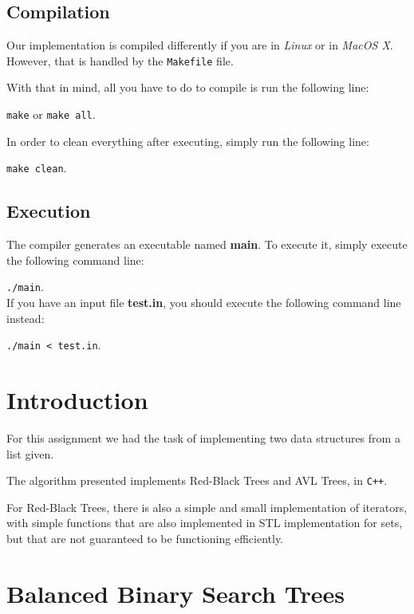 \documentclass[12pt,a4paper,oneside]{article}
\theoremstyle{definition}
\begin{document}
\subsection{Compilation}\label{subsec:compile}

Our implementation is compiled differently if you are in \textit{Linux} or in \textit{MacOS X}. However, that is handled by the \texttt{Makefile} file.

With that in mind, all you have to do to compile is run the following line:

\texttt{make} or \texttt{make all}.

In order to clean everything after executing, simply run the following line:

\texttt{make clean}.

\subsection{Execution}

The compiler generates an executable named \textbf{main}. To execute it, simply execute the following command line:

\texttt{./main}.\\

If you have an input file \textbf{test.in}, you should execute the following command line instead:

\texttt{./main < test.in}.

\section{Introduction}\label{sec:intro}
For this assignment we had the task of implementing two data structures from a list given. 

The algorithm presented implements Red-Black Trees and AVL Trees, in \texttt{C++}.

For Red-Black Trees, there is also a simple and small implementation of iterators, with simple functions that are also implemented in STL implementation for sets, but that are not guaranteed to be functioning efficiently.

\section{Balanced Binary Search Trees}
\end{document}
